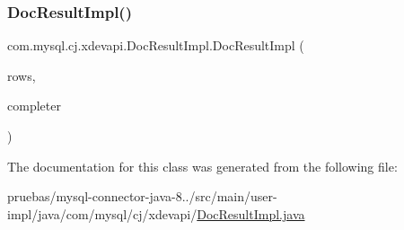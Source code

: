 \subsubsection{\texorpdfstring{Doc\+Result\+Impl()}{DocResultImpl()}}
{\footnotesize\ttfamily com.\+mysql.\+cj.\+xdevapi.\+Doc\+Result\+Impl.\+Doc\+Result\+Impl (\begin{DoxyParamCaption}\item[{\mbox{\hyperlink{interfacecom_1_1mysql_1_1cj_1_1result_1_1_row_list}{Row\+List}}}]{rows,  }\item[{Supplier$<$ \mbox{\hyperlink{classcom_1_1mysql_1_1cj_1_1protocol_1_1x_1_1_statement_execute_ok}{Statement\+Execute\+Ok}} $>$}]{completer }\end{DoxyParamCaption})}



The documentation for this class was generated from the following file\+:\begin{DoxyCompactItemize}
\item 
pruebas/mysql-\/connector-\/java-\/8../src/main/user-\/impl/java/com/mysql/cj/xdevapi/\mbox{\hyperlink{_doc_result_impl_8java}{Doc\+Result\+Impl.\+java}}\end{DoxyCompactItemize}
